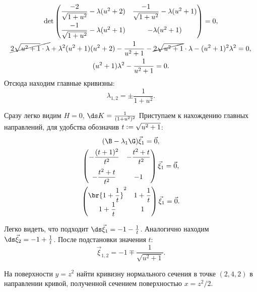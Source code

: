 \begin{solution}
\begin{gather*}
		\det
		\begin{pmatrix}
			\dfrac{-2}{\sqrt{1 + u^2}} - \lambda(u^2 + 2) & \dfrac{-1}{\sqrt{1 + u^2}} - \lambda(u^2 + 1)\\[1em]
			\dfrac{-1}{\sqrt{1 + u^2}} - \lambda(u^2 + 1) & -\lambda(u^2 + 1)
		\end{pmatrix} = 0,\\
		\cancel{2\sqrt{u^2 + 1} \cdot \lambda} + \lambda^2(u^2 + 1)(u^2 + 2) - \frac{1}{u^2 + 1} - \cancel{2\sqrt{u^2 + 1}} \cdot \lambda - (u^2 + 1)^2\lambda^2 = 0,\\
		(u^2 + 1)\lambda^2 - \frac{1}{u^2 + 1} = 0.
	\end{gather*}
	Отсюда находим главные кривизны:
	\[
		\lambda_{1, 2} = \pm\frac{1}{1 + u^2}.
	\]

	Сразу легко видим $H = 0$, $\ds K = \frac{1}{(1 + u^2)^2}$ Приступаем к нахождению главных направлений, для удобства обозначив $t \vcentcolon = \sqrt{u^2 + 1}$:
	\begin{gather*}
		(\B - \lambda_1\G)\vec{\xi}_1 = \vec{0},\\
		\begin{pmatrix}
			-\dfrac{(t + 1)^2}{t^2} & -\dfrac{t^2 + t}{t^2}\\[1em]
			-\dfrac{t^2 + t}{t^2} & -1
		\end{pmatrix}\vec{\xi}_1 = \vec{0},\\
		\begin{pmatrix}
			\br{1 + \dfrac{1}{t}}^2 & 1 + \dfrac{1}{t}\\
			1 + \dfrac{1}{t} & 1
		\end{pmatrix}\vec{\xi}_1 = \vec{0}.
	\end{gather*}

	Легко видеть, что подходит $\ds\vec{\xi}_1 = -1 - \frac{1}{t}$. Аналогично находим $\ds\vec{\xi}_2 = -1 + \frac{1}{t}$. После подстановки значения $t$:
	\[
		\vec{\xi}_{1, 2} = -1 \mp \frac{1}{\sqrt{u^2 + 1}}.
	\]
\end{solution}

\begin{problem}
	На поверхности $y = z^2$ найти кривизну нормального сечения в точке $(2, 4, 2)$ в направлении кривой, полученной сечением поверхностью $x = z^2 / 2$.
\end{problem}

